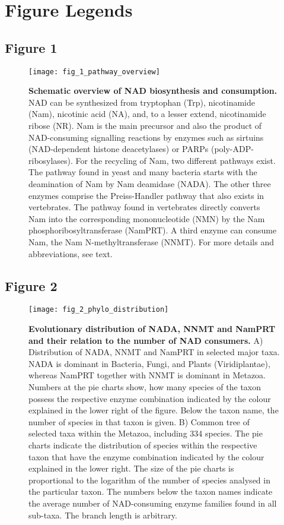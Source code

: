 
\newpage

\section{Figure Legends}

\subsection{Figure 1}

\begin{figure}[ht]
  \centering
  \texttt{[image: fig\_1\_pathway\_overview]}
  \caption{\textbf{Schematic overview of NAD biosynthesis and consumption.} NAD can be synthesized from tryptophan (Trp), nicotinamide (Nam), nicotinic acid (NA), and, to a lesser extend, nicotinamide ribose (NR). Nam is the main precursor and also the product of NAD-consuming signalling reactions by enzymes such as sirtuins (NAD-dependent histone deacetylases) or PARPs (poly-ADP-ribosylases). For the recycling of Nam, two different pathways exist. The pathway found in yeast and many bacteria starts with the deamination of Nam by Nam deamidase (NADA). The other three enzymes comprise the Preiss-Handler pathway that also exists in vertebrates. The pathway found in vertebrates directly converts Nam into the corresponding mononucleotide (NMN) by the Nam phosphoribosyltransferase (NamPRT). A third enzyme can consume Nam, the Nam N-methyltransferase (NNMT). For more details and abbreviations, see text.}
  \label{fig:pathway_overview}
\end{figure}

\newpage


\subsection{Figure 2}

\begin{figure}[ht]
  \centering
  \texttt{[image: fig\_2\_phylo\_distribution]}
  \caption{\textbf{Evolutionary distribution of NADA, NNMT and NamPRT and their relation to the number of NAD consumers.} A) Distribution of NADA, NNMT and NamPRT in selected major taxa. NADA is dominant in Bacteria, Fungi, and Plants (Viridiplantae), whereas NamPRT together with NNMT is dominant in Metazoa. Numbers at the pie charts show, how many species of the taxon possess the respective enzyme combination indicated by the colour explained in the lower right of the figure. Below the taxon name, the number of species in that taxon is given. B) Common tree of selected taxa within the Metazoa, including 334 species. The pie charts indicate the distribution of species within the respective taxon that have the enzyme combination indicated by the colour explained in the lower right. The size of the pie charts is proportional to the logarithm of the number of species analysed in the particular taxon. The numbers below the taxon names indicate the average number of NAD-consuming enzyme families found in all sub-taxa. The branch length is arbitrary.}
  \label{fig:phylo_distribution}
\end{figure}


